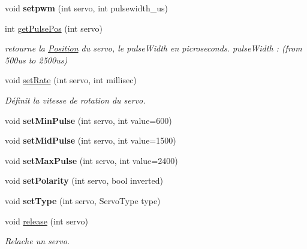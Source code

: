 \begin{DoxyCompactItemize}
void {\bfseries setpwm} (int servo, int pulsewidth\+\_\+us)
\item 
int \hyperlink{classServoDriver_a716d64d7b2203c9cb8dff5c90d0a5dd9}{get\+Pulse\+Pos} (int servo)
\begin{DoxyCompactList}\small\item\em retourne la \hyperlink{structPosition}{Position} du servo, le pulse\+Width en picroseconds. pulse\+Width \+: (from 500us to 2500us) \end{DoxyCompactList}\item 
\mbox{\label{classServoDriver_a27d45f075f5fb2333937ab253a8cce6c}} 
void \hyperlink{classServoDriver_a27d45f075f5fb2333937ab253a8cce6c}{set\+Rate} (int servo, int millisec)
\begin{DoxyCompactList}\small\item\em Définit la vitesse de rotation du servo. \end{DoxyCompactList}\item 
\mbox{\label{classServoDriver_a40ec259cb0ced3154b1e73cc52d48938}} 
void {\bfseries set\+Min\+Pulse} (int servo, int value=600)
\item 
\mbox{\label{classServoDriver_a92d53f7f50a7eb95e14ae358ad0b7d23}} 
void {\bfseries set\+Mid\+Pulse} (int servo, int value=1500)
\item 
\mbox{\label{classServoDriver_aaaeaab97cef5c2ebcd05c265fdff747f}} 
void {\bfseries set\+Max\+Pulse} (int servo, int value=2400)
\item 
\mbox{\label{classServoDriver_af25a01b493392a31ce80bed32a51f97f}} 
void {\bfseries set\+Polarity} (int servo, bool inverted)
\item 
\mbox{\label{classServoDriver_abf685dbc27150bf205fd1e4fc8a7ed0d}} 
void {\bfseries set\+Type} (int servo, Servo\+Type type)
\item 
\mbox{\label{classServoDriver_aa1040b0db7ed851aec70a122301fe665}} 
void \hyperlink{classServoDriver_aa1040b0db7ed851aec70a122301fe665}{release} (int servo)
\begin{DoxyCompactList}\small\item\em Relache un servo. \end{DoxyCompactList}\item 

\end{DoxyCompactItemize}
